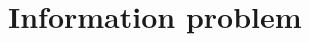 \documentclass[english, a4, 12pt]{scrartcl}
\begin{document}
\section{Information problem}
	
	
	
	
	
	
	
	

\newpage
\printbibliography
\end{document}
